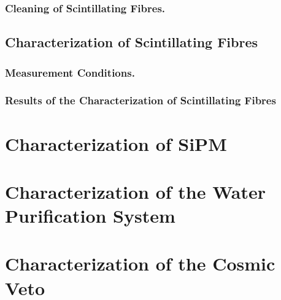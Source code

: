 \documentclass[12pt,a4paper]{book}
\begin{document}
			\subsubsection{Cleaning of Scintillating Fibres.}\label{subsubsec:CleaningProcess}
			
			
		\subsection{Characterization of Scintillating Fibres}\label{subsec:CharacterizationFibres}
		
		
			\subsubsection{Measurement Conditions.}\label{subsubsec:CharacterizationSystem}
			
		
			\subsubsection{Results of the Characterization of Scintillating Fibres}\label{subsubsec:CharacterizationFibers}
			
				
	\section[Characterization of the SiPM]{Characterization of SiPM}\label{sec:CharacterizationSiPM}
	
	
	\section{Characterization of the Water Purification System}\label{sec:CharacterizationUltraPureWaterSystem}
	
					 
	\section[Characterization of the Cosmic Veto]{Characterization of the Cosmic Veto}\label{sec:TritiumActiveVeto}
	
\end{document}
